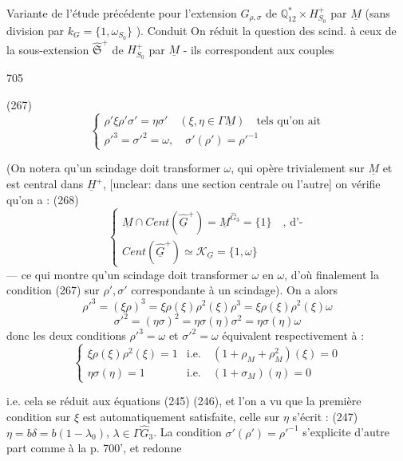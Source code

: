 Variante de l'étude précédente pour
l'extension $G_{\rho,\sigma}$ de $\mathbb{Q}_{12}^* \times H_{S_0}^+$ par $\underline{M}$
(sans division par $k_G = \{1, \omega_{S_0}\}$ ). Conduit
On réduit la question des scind. à ceux
de la sous-extension $\hat{\mathfrak{S}}^+$ de $H_{S_0}^+$ par
$\underline{M}$ - ils correspondent aux couples

\newpage


705

(267) $$ \begin{cases} \rho' \xi \rho' \sigma' = \eta \sigma' \quad (\xi, \eta \in \Gamma \underline{M}) \quad \text{tels qu'on ait} \\ \rho'^3 = \sigma'^2 = \omega, \quad \sigma'(\rho') = \rho'^{-1} \end{cases} $$

(On notera qu'un scindage doit transformer $\omega$, qui opère trivialement sur $\underline{M}$ et est central dans $\underline{H}^+$, [unclear: dans une section centrale ou l'autre] on vérifie qu'on a :
(268) $$ \begin{cases} \underline{M} \cap Cent(\underline{\widehat{G}}^+) = \underline{M}^{\widehat{G}_3} = \{1\} \quad \text{, d'-} \\ Cent(\underline{\widehat{G}}^+) \simeq \mathcal{K}_{\underline{G}} = \{1, \omega\} \end{cases} $$
— ce qui montre qu'un scindage doit transformer $\omega$ en $\omega$, d'où finalement la condition (267) sur $\rho', \sigma'$ correspondante à un scindage). On a alors
$$ \rho'^3 = (\xi \rho)^3 = \xi \rho(\xi) \rho^2(\xi) \rho^3 = \xi \rho(\xi) \rho^2(\xi) \omega $$
$$ \sigma'^2 = (\eta \sigma)^2 = \eta \sigma(\eta) \sigma^2 = \eta \sigma(\eta) \omega $$
donc les deux conditions $\rho'^3 = \omega$ et $\sigma'^2 = \omega$ équivalent respectivement à :
$$ \begin{cases} \xi \rho(\xi) \rho^2(\xi) = 1 & \text{i.e.} \quad (1 + \rho_M + \rho_M^2)(\xi) = 0 \\ \eta \sigma(\eta) = 1 & \text{i.e.} \quad (1 + \sigma_M)(\eta) = 0 \end{cases} $$

i.e. cela se réduit aux équations (245) (246), et l'on a vu que la première condition sur $\xi$ est automatiquement satisfaite, celle sur $\eta$ s'écrit : (247) $\eta = b \delta = b (1-\lambda_0)$, $\lambda \in \Gamma \widehat{G}_3$.
La condition $\sigma'(\rho') = \rho'^{-1}$ s'explicite d'autre part comme à la p. 700', et redonne

